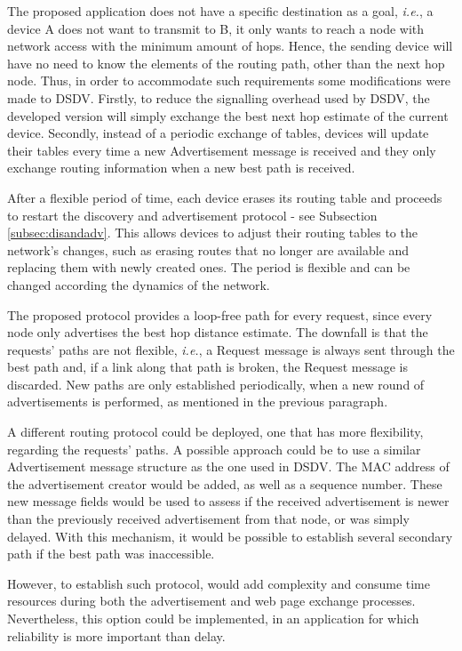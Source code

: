 The proposed application does not have a specific destination as a goal, \textit{i.e.}, a device A does not want to transmit to B, it only wants to reach a node with network access with the minimum amount of hops. Hence, the sending device will have no need to know the elements of the routing path, other than the next hop node. Thus, in order to accommodate such requirements some modifications were made to \gls{DSDV}. Firstly, to reduce the signalling overhead used by \gls{DSDV}, the developed version will simply exchange the best next hop estimate of the current device. Secondly, instead of a periodic exchange of tables, devices will update their tables every time a new Advertisement message is received and they only exchange routing information when a new best path is received.

After a flexible period of time, each device erases its routing table and proceeds to restart the discovery and advertisement protocol - see Subsection \ref{subsec:disandadv}. This allows devices to adjust their routing tables to the network's changes, such as erasing routes that no longer are available and replacing them with newly created ones. The period is flexible and can be changed according the dynamics of the network.

The proposed protocol provides a loop-free path for every request, since every node only advertises the best hop distance estimate. The downfall is that the requests' paths are not flexible, \textit{i.e.}, a Request message is always sent through the best path and, if a link along that path is broken, the Request message is discarded. New paths are only established periodically, when a new round of advertisements is performed, as mentioned in the previous paragraph.

A different routing protocol could be deployed, one that has more flexibility, regarding the requests' paths. A possible approach could be to use a similar Advertisement message structure as the one used in \gls{DSDV}. The \gls{MAC} address of the advertisement creator would be added, as well as a sequence number. These new message fields would be used to assess if the received advertisement is newer than the previously received advertisement from that node, or was simply delayed. With this mechanism, it would be possible to establish several secondary path if the best path was inaccessible.

However, to establish such protocol, would add complexity and consume time resources during both the advertisement and web page exchange processes. Nevertheless, this option could be implemented, in an application for which reliability is more important than delay.

